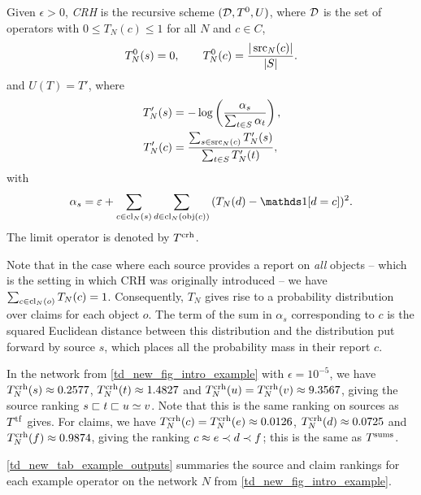 \begin{definition}
    Given $\epsilon > 0$, \emph{CRH} is the recursive scheme $(\mathcal{D}, T^0, U)$,
    where $\mathcal{D}$ is the set of operators with $0 \le T_N(c) \le 1$ for all $N$
    and $c \in C$,
    \[
        T^0_N(s) = 0, \qquad
        T^0_N(c) = \frac{|\operatorname{src}_N(c)|}{|S|}.
    \]
    and $U(T) = T'$, where
    \begin{align*}
        T'_N(s) &= -\log\left(\frac{\alpha_s}{\sum_{t \in S}{\alpha_t}}\right), \\
        T'_N(c) &=
            \frac{\sum_{s \in \operatorname{src}_N(c)}{T'_N(s)}}{\sum_{t \in S}{T'_N(t)}},
    \end{align*}
    with
    \[
        \alpha_s = \epsilon + \sum_{c \in \claims_N(s)}{
            \sum_{d \in \claims_N(\obj(c))}{
                (T_N(d) - \indicator{d = c})^2
            }
        }.
    \]
    The limit operator is denoted by $T^{\operatorname{crh}}$.
\end{definition}

Note that in the case where each source provides a report on \emph{all} objects
-- which is the setting in which CRH was originally introduced -- we have
$\sum_{c \in \operatorname{cl}_N(o)}{T_N(c)} = 1$. Consequently, $T_N$ gives rise to a
probability distribution over claims for each object $o$. The term of the sum
in $\alpha_s$ corresponding to $c$ is the squared Euclidean distance between
this distribution and the distribution put forward by source $s$, which places
all the probability mass in their report $c$.

In the network from \cref{td_new_fig_intro_example} with $\epsilon = 10^{-5}$,
we have $T^{\operatorname{crh}}_N(s) \approx 0.2577$, $T^{\operatorname{crh}}_N(t) \approx 1.4827$ and $T^{\operatorname{crh}}_N(u) =
T^{\operatorname{crh}}_N(v) \approx 9.3567$, giving the source ranking $s \sqsubset t \sqsubset u \simeq v$.
Note that this is the same ranking on sources as $T^{\operatorname{tf}}$ gives. For
claims, we have $T^{\operatorname{crh}}_N(c) = T^{\operatorname{crh}}_N(e) \approx 0.0126$, $T^{\operatorname{crh}}_N(d) \approx
0.0725$ and $T^{\operatorname{crh}}_N(f) \approx 0.9874$, giving the ranking $c \approx e \prec d
\prec f$; this is the same as $T^{\operatorname{sums}}$.

\cref{td_new_tab_example_outputs} summaries the source and claim rankings for
each example operator on the network $N$ from \cref{td_new_fig_intro_example}.

